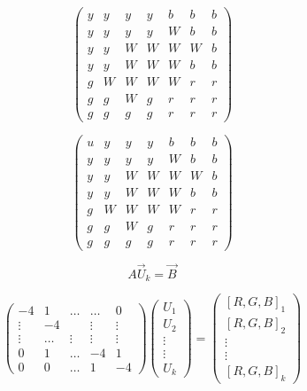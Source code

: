 \documentclass{article}
\begin{document}
\begin{equation}
\begin{pmatrix} 
y&y &y & y& b& b& b \\
y&y &y & y& W& b& b \\
y&y &W & W& W& W& b \\
y&y &W & W& W& b& b \\
g&W &W & W& W& r& r \\
g&g &W & g& r& r& r \\
g&g &g & g& r& r& r 
\end{pmatrix} 
\end{equation}

\begin{equation}
\begin{pmatrix} 
u&y &y & y& b& b& b \\
y&y &y & y& W& b& b \\
y&y &W & W& W& W& b \\
y&y &W & W& W& b& b \\
g&W &W & W& W& r& r \\
g&g &W & g& r& r& r \\
g&g &g & g& r& r& r 
\end{pmatrix} 
\end{equation}

\begin{equation}
	A \vec{U}_k = \vec{B}
\end{equation}

\begin{equation}
\begin{pmatrix} 
-4	&1 		&\ldots	& \ldots& 0 \\
\vdots&-4  	&  	 	&\vdots  &\vdots  \\
\vdots&\ldots 	&\vdots	&\vdots  & \vdots \\
0	&1 		&\ldots &-4&  1 \\
0	&0 		&\ldots & 1& -4 
\end{pmatrix}
\begin{pmatrix} 
U_1\\
U_2\\
\vdots\\
\vdots\\
U_k
\end{pmatrix}
= \begin{pmatrix} 
[R,G,B]_1\\
[R,G,B]_2\\
\vdots\\
\vdots\\
[R,G,B]_k
\end{pmatrix}
\end{equation}
\end{document}

